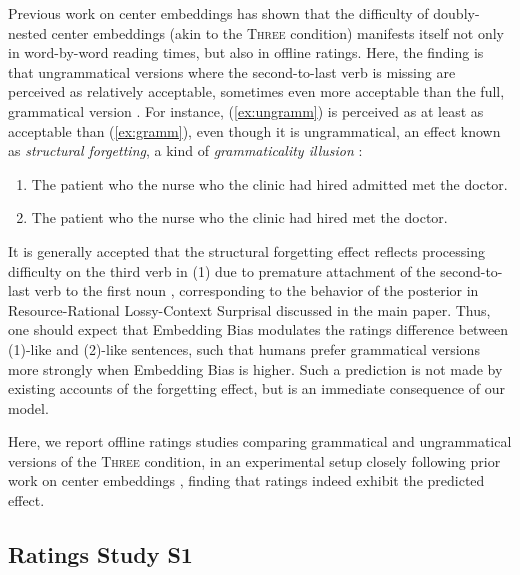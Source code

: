 Previous work on center embeddings has shown that the difficulty of doubly-nested center embeddings (akin to the \textsc{Three} condition) manifests itself not only in word-by-word reading times, but also in offline ratings.
Here, the finding is that ungrammatical versions where the second-to-last verb is missing are perceived as relatively acceptable, sometimes even more acceptable than the full, grammatical version \citep{frazier1985syntactic,gibson1999memory,Christiansen2009AUA,Gimenes2009WhenAM,Frank2018JudgementsAD}. 
For instance, (\ref{ex:ungramm}) is perceived as at least as acceptable than (\ref{ex:gramm}), even though it is ungrammatical, an effect known as \emph{structural forgetting}, a kind of \emph{grammaticality illusion} \citep{frazier1985syntactic, gibson1999memory}:

\begin{enumerate}
	\item\label{ex:gramm} The patient who the nurse who the clinic had hired admitted met the doctor.
	\item\label{ex:ungramm} The patient who the nurse who the clinic had hired met the doctor.
\end{enumerate}
It is generally accepted that the structural forgetting effect reflects processing difficulty on the third verb in (1) due to premature attachment of the second-to-last verb to the first noun \citep{gibson1999memory,lewis2005activation}, corresponding to the behavior of the posterior in Resource-Rational Lossy-Context Surprisal discussed in the main paper.
Thus, one should expect that Embedding Bias modulates the ratings difference between (1)-like and (2)-like sentences, such that humans prefer grammatical versions more strongly when Embedding Bias is higher.
Such a prediction is not made by existing accounts of the forgetting effect, but is an immediate consequence of our model.

Here, we report offline ratings studies comparing grammatical and ungrammatical versions of the \textsc{Three} condition, in an experimental setup closely following prior work on center embeddings \citep{gibson1999memory}, finding that ratings indeed exhibit the predicted effect.


\subsection{Ratings Study S1}


